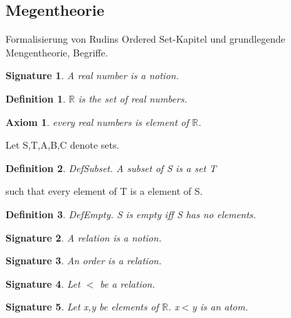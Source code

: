 \documentclass{article}
\newenvironment{forthel}{\begin{leftbar}}{\end{leftbar}}
\newtheorem{axiom}{Axiom}
\newtheorem{definition}{Definition}
\newtheorem{signature}{Signature}
\begin{document}
\subsection{Megentheorie}

Formalisierung von Rudins Ordered Set-Kapitel und grundlegende Mengentheorie, Begriffe.\\

\begin{forthel}
[set/-s] [element/-s] [belong/-s] [subset/-s] [relation/-s] [number/-s]

\begin{signature} A real number is a notion.

\end{signature}
\begin{definition} $\mathbb{R}$ is the set of real numbers. 

\end{definition}
\begin{axiom} every real numbers is element of $\mathbb{R}$.

\end{axiom}


Let S,T,A,B,C denote sets.

\begin{definition} DefSubset.   A subset of S is a set T

\end{definition}
such that every element of T is a element of S.

\begin{definition} DefEmpty.    S is empty iff S has no elements.

\end{definition}

\begin{signature} A relation is a notion.

\end{signature}

\begin{signature} An order is a relation.

\end{signature}

\begin{signature}Let $<$ be a relation.

\end{signature}

\begin{signature} Let x,y be elements of $\mathbb{R}$. x$<$y is an atom.

\end{signature}


\end{forthel}
\end{document}
